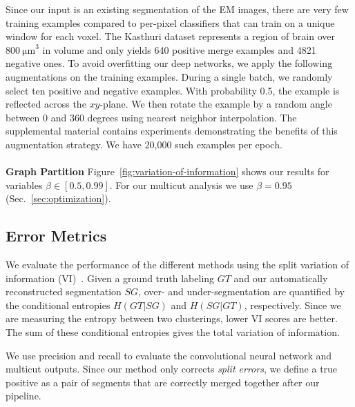 Since our input is an existing segmentation of the EM images, there are very few training examples compared to per-pixel classifiers that can train on a unique window for each voxel. 
The Kasthuri dataset represents a region of brain over $\SI[product-units=single]{800}{\micro\meter}^3$ in volume and only yields 640 positive merge examples and 4821 negative ones.
To avoid overfitting our deep networks, we apply the following augmentations on the training examples.
During a single batch, we randomly select ten positive and negative examples. 
With probability 0.5, the example is reflected across the $xy$-plane. 
We then rotate the example by a random angle between $0$ and $360$ degrees using nearest neighbor interpolation. 
The supplemental material contains experiments demonstrating the benefits of this augmentation strategy.
We have 20,000 such examples per epoch.
\\~\\
\noindent\textbf{Graph Partition}
Figure~\ref{fig:variation-of-information} shows our results for variables $\beta \in [0.5, 0.99]$. 
For our multicut analysis we use $\beta = 0.95$ (Sec.~\ref{sec:optimization}). 

\subsection{Error Metrics}
\label{sec:variation-of-information}
We evaluate the performance of the different methods using the split variation of information (VI)~\cite{meila2003comparing}.
Given a ground truth labeling $GT$ and our automatically reconstructed segmentation $SG$, over- and under-segmentation are quantified by the conditional entropies $H(GT | SG)$ and $H(SG | GT)$, respectively. 
Since we are measuring the entropy between two clusterings, lower VI scores are better.
The sum of these conditional entropies gives the total variation of information.

We use precision and recall to evaluate the convolutional neural network and multicut outputs. 
Since our method only corrects \textit{split errors}, we define a true positive as a pair of segments that are correctly merged together after our pipeline.
